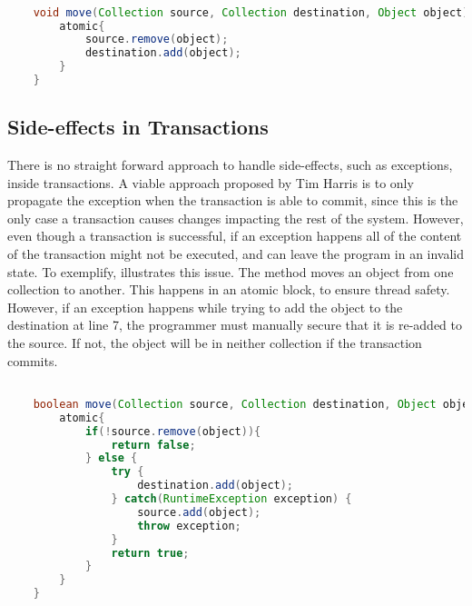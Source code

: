 \begin{lstlisting}[label=lst:stm_exception_new,
  caption={Exceptions in Transaction},
  language=Java,  
  showspaces=false,
  showtabs=false,
  breaklines=true,
  showstringspaces=false,
  breakatwhitespace=true,
  commentstyle=\color{greencomments},
  keywordstyle=\color{bluekeywords},
  stringstyle=\color{redstrings},
  morekeywords={atomic, retry, orElse}]  % Start your code-block

	void move(Collection source, Collection destination, Object object){
		atomic{
			source.remove(object);
			destination.add(object);
		}
	}      
\end{lstlisting}

\subsection{Side-effects in Transactions}
\label{subsec:stm:side_effects}
There is no straight forward approach to handle side-effects, such as exceptions, inside transactions. A viable approach proposed by Tim Harris\cite{harris2003language} is to only propagate the exception when the transaction is able to commit, since this is the only case a transaction causes changes impacting the rest of the system. However, even though a transaction is successful, if an exception happens all of the content of the transaction might not be executed, and can leave the program in an invalid state. To exemplify,  illustrates this issue. The method  moves an object from one collection to another. This happens in an atomic block, to ensure thread safety. However, if an exception happens while trying to add the object to the destination at line 7, the programmer must manually secure that it is re-added to the source. If not, the object will be in neither collection if the transaction commits. 
\begin{lstlisting}[label=lst:stm_exception,
  caption={[Exceptions in Transactions]Exceptions in Transactions \cite[p. 3]{harris2003language}},
  language=Java,  
  showspaces=false,
  showtabs=false,
  breaklines=true,
  showstringspaces=false,
  breakatwhitespace=true,
  commentstyle=\color{greencomments},
  keywordstyle=\color{bluekeywords},
  stringstyle=\color{redstrings},
  morekeywords={atomic, retry, orElse}]  % Start your code-block

	boolean move(Collection source, Collection destination, Object object){
		atomic{
			if(!source.remove(object)){
				return false;
			} else {
				try { 
					destination.add(object);
				} catch(RuntimeException exception) {
					source.add(object);
					throw exception;
				}
				return true;
			}
		}
	}      
\end{lstlisting}

